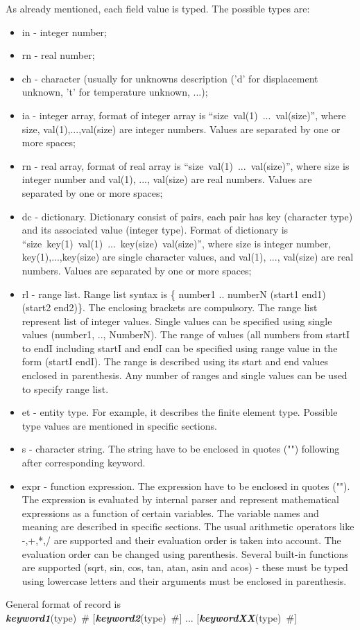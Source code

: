 \documentclass[draft]{article}
\newcommand{\keywordnotype}[1]{\mbox{{\it{\bf{#1}}}}}
\newcommand{\keyword}[2]{\mbox{{\keywordnotype{#1}\tiny (#2)}}}
\newcommand{\field}[2]{\mbox{\keyword{#1}{#2}~\#}}
\newcommand{\optField}[2]{\mbox{[\field{#1}{#2}]}}
\begin{document}
As already mentioned, each field value is typed. The possible types are:
\begin{itemize}
\item in - integer number;
\item rn - real number;
\item ch - character (usually for unknowns description ('d' for
displacement unknown, 't' for temperature unknown, ...);
\item ia - integer array, format of integer array is
``size~val(1)~...~val(size)'', where size, val(1),...,val(size) are
integer numbers. Values are separated by one or more spaces;
\item rn - real array, format of real array is
``size~val(1)~...~val(size)'', where size is integer number and val(1),
..., val(size) are real numbers. Values are separated by one or more spaces;
\item dc - dictionary. Dictionary consist of pairs, each pair has key
(character type) and its associated value (integer type).
Format of dictionary is
``size~key(1)~val(1)~...~key(size)~val(size)'', where size is integer
number, key(1),...,key(size) are single character values, and val(1),
..., val(size) are real numbers. Values are separated by one or more spaces;
\item rl - range list. Range list syntax is \{ number1 .. numberN (start1
end1) (start2 end2)\}. The enclosing brackets are compulsory. The range
list represent list of integer values. Single values can be specified
using single values (number1, .., NumberN). The range of values
(all numbers from startI to endI including startI and endI can be
specified using range value in the form (startI endI). The range is
described using its start and end values enclosed in parenthesis.
Any number of ranges and single values can be used to specify range list.
\item et - entity type. For  example, it describes the finite element
type. Possible type values are mentioned in specific sections.
\item s - character string. The string have to be enclosed
in quotes ("") following after corresponding keyword.
\item expr - function expression. The expression have to be enclosed
in quotes (""). The expression is evaluated by internal parser and 
represent mathematical expressions as a function of certain variables.
The variable names and meaning are described in specific sections. 
The usual arithmetic operators like -,+,*,/ are supported and their
evaluation order is taken into account. The evaluation order can be
changed using parenthesis. Several built-in functions are supported
(sqrt, sin, cos, tan, atan, asin and acos) - these must be typed using 
lowercase letters and their arguments must be enclosed in parenthesis.
\end{itemize}
General format of record is \\
\field{keyword1}{type} \optField{keyword2}{type} ... \optField{keywordXX}{type}\\
\end{document}
